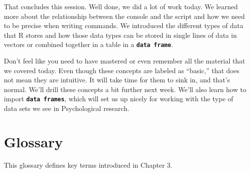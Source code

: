 \documentclass[
]{book}
\begin{document}
That concludes this session. Well done, we did a lot of work today. We learned more about the relationship between the console and the script and how we need to be precise when writing commands. We introduced the different types of data that R stores and how those data types can be stored in single lines of data in vectors or combined together in a table in a \textbf{\texttt{data\ frame}}.

Don't feel like you need to have mastered or even remember all the material that we covered today. Even though these concepts are labeled as ``basic,'' that does not mean they are intuitive. It will take time for them to sink in, and that's normal. We'll drill these concepts a bit further next week. We'll also learn how to import \textbf{\texttt{data\ frames}}, which will set us up nicely for working with the type of data sets we see in Psychological research.

\hypertarget{glossary-1}{%
\section{Glossary}\label{glossary-1}}

This glossary defines key terms introduced in Chapter 3.
\end{document}
